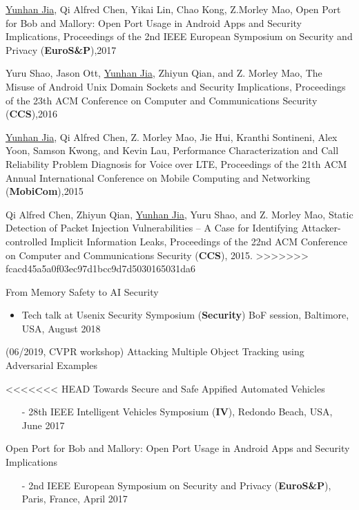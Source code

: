 \documentclass[margin]{res}
\begin{document}
\begin{resume}
\underline{Yunhan Jia}, Qi Alfred Chen, Yikai Lin, Chao Kong, Z.Morley Mao, 
Open Port for Bob and Mallory: Open Port Usage in Android Apps and Security Implications, Proceedings of the 2nd IEEE European Symposium on Security and Privacy (\textbf{EuroS\&P}),2017 \href{http://web.eecs.umich.edu/\~jackjia/material/open\_euro17.pdf}{\color{blue}{[PDF]}}

Yuru Shao, Jason Ott, \underline{Yunhan Jia}, Zhiyun Qian, and Z. Morley Mao,
The Misuse of Android Unix Domain Sockets and Security Implications, Proceedings of the 23th ACM Conference on Computer and Communications Security (\textbf{CCS}),2016 \href{http://web.eecs.umich.edu/\~jackjia/material/misuse\_ccs16.pdf}{\color{blue}{[PDF]}}

\underline{Yunhan Jia}, Qi Alfred Chen, Z. Morley Mao, Jie Hui, Kranthi Sontineni, Alex Yoon, Samson Kwong, and Kevin Lau, 
Performance Characterization and Call Reliability Problem Diagnosis for Voice over LTE, Proceedings of the 21th ACM Annual 
International Conference on Mobile Computing and Networking (\textbf{MobiCom}),2015 \href{http://web.eecs.umich.edu/\~jackjia/material/performance\_mobicom15.pdf}{\color{blue}{[PDF]}}

Qi Alfred Chen, Zhiyun Qian, \underline{Yunhan Jia}, Yuru Shao, and Z. Morley Mao, Static Detection of Packet Injection
Vulnerabilities -- A Case for Identifying Attacker-controlled Implicit Information Leaks, Proceedings of the 22nd ACM
Conference on Computer and Communications Security (\textbf{CCS}), 2015. \href{http://web.eecs.umich.edu/\~jackjia/material/static\_ccs15.pdf}{\color{blue}{[PDF]}}
>>>>>>> fcacd45a5a0f03ec97d1bcc9d7d5030165031da6

From Memory Safety to AI Security
\begin{itemize}
    \item Tech talk at Usenix Security Symposium (\textbf{Security}) BoF session, Baltimore, USA, August 2018 
\end{itemize}

(06/2019, CVPR workshop) Attacking Multiple Object Tracking using Adversarial Examples

<<<<<<< HEAD
Towards Secure and Safe Appified Automated Vehicles
\begin{itemize}
    \item[-] 28th IEEE Intelligent Vehicles Symposium (\textbf{IV}), Redondo Beach, USA, June 2017
\end{itemize}

Open Port for Bob and Mallory: Open Port Usage in Android Apps and Security Implications
\begin{itemize}
    \item[-] 2nd IEEE European Symposium on Security and Privacy (\textbf{EuroS\&P}), Paris, France, April 2017
\end{itemize}


\end{resume}
\end{document}
